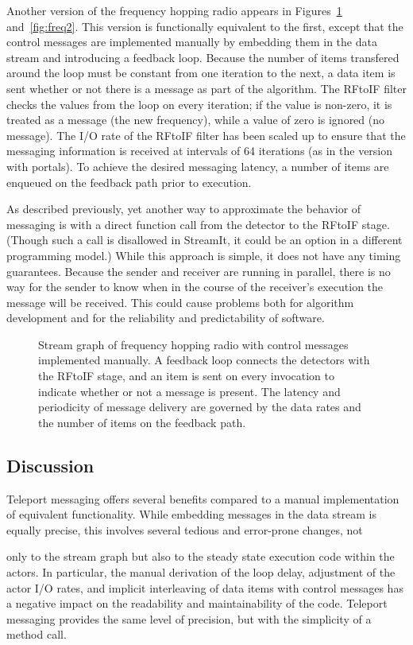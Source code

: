 Another version of the frequency hopping radio appears in
Figures~\ref{fig:fhr-manual} and~\ref{fig:freq2}.  This version is
functionally equivalent to the first, except that the control messages
are implemented manually by embedding them in the data stream and
introducing a feedback loop.  Because the number of items transfered
around the loop must be constant from one iteration to the next, a
data item is sent whether or not there is a message as part of the
algorithm.  The RFtoIF filter checks the values from the loop on every
iteration; if the value is non-zero, it is treated as a message (the
new frequency), while a value of zero is ignored (no message).  The
I/O rate of the RFtoIF filter has been scaled up to ensure that the
messaging information is received at intervals of 64 iterations (as in
the version with portals).  To achieve the desired messaging latency,
a number of items are enqueued on the feedback path prior to
execution.

As described previously, yet another way to approximate the behavior
of messaging is with a direct function call from the detector to the
RFtoIF stage.  (Though such a call is disallowed in StreamIt, it could
be an option in a different programming model.)  While this approach
is simple, it does not have any timing guarantees.  Because the sender
and receiver are running in parallel, there is no way for the sender
to know when in the course of the receiver's execution the message
will be received.  This could cause problems both for algorithm
development and for the reliability and predictability of software.

\begin{figure}[t]
\caption{\small Stream graph of frequency hopping radio with control
messages implemented manually.  A feedback loop connects the detectors
with the RFtoIF stage, and an item is sent on every invocation to
indicate whether or not a message is present.  The latency and
periodicity of message delivery are governed by the data rates and the
number of items on the feedback
path. \protect\label{fig:fhr-manual}}
\end{figure}

\subsection{Discussion}

Teleport messaging offers several benefits compared to a manual
implementation of equivalent functionality.  While embedding messages
in the data stream is equally precise, this involves several tedious
and error-prone changes, not
%

\clearpage
\noindent
%
only to the stream graph but also to the steady state execution code
within the actors.  In particular, the manual derivation of the loop
delay, adjustment of the actor I/O rates, and implicit interleaving of
data items with control messages has a negative impact on the
readability and maintainability of the code.  Teleport messaging
provides the same level of precision, but with the simplicity of a
method call.

